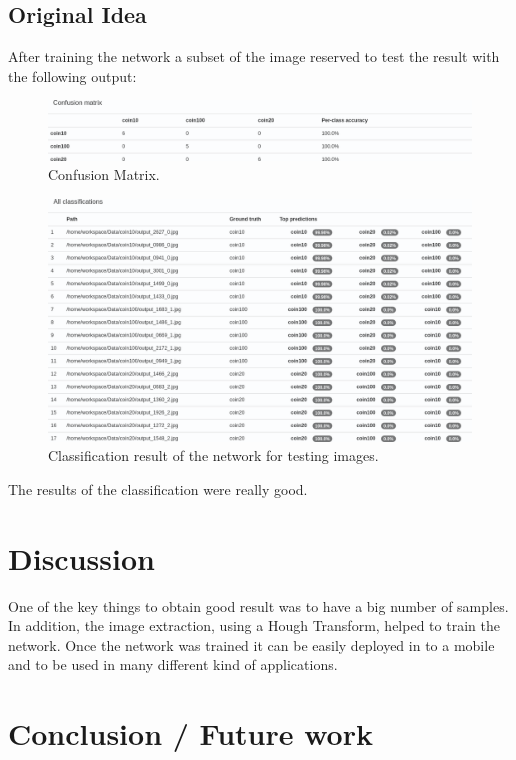 \documentclass[10pt,journal,compsoc]{IEEEtran}
\begin{document}
\subsection{Original Idea}

After training the network a subset of the image reserved to test the result with the following output:

\begin{figure}[h]
\centering
\includegraphics[scale=0.2]{confusion-matrix}
\caption{Confusion Matrix.}
\label{fig:figure5}
\end{figure}


\begin{figure}[h]
\centering
\includegraphics[scale=0.2]{classification-all}
\caption{Classification result of the network for testing images.}
\label{fig:figure6}
\end{figure}

The results of the classification were really good. 

\section{Discussion}

One of the key things to obtain good result was to have a big number of samples. In addition, the image extraction, using a Hough Transform, helped to train the network. Once the network was trained it can be easily deployed in to a mobile and to be used in many different kind of applications.



	
\section{Conclusion / Future work}
\end{document}
